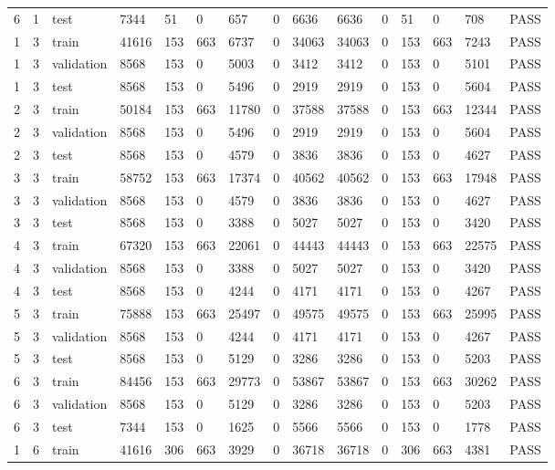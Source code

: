 \begin{longtable}{lllllllllllllll}
6 & 1 & test & 7344 & 51 & 0 & 657 & 0 & 6636 & 6636 & 0 & 51 & 0 & 708 & PASS \\
1 & 3 & train & 41616 & 153 & 663 & 6737 & 0 & 34063 & 34063 & 0 & 153 & 663 & 7243 & PASS \\
1 & 3 & validation & 8568 & 153 & 0 & 5003 & 0 & 3412 & 3412 & 0 & 153 & 0 & 5101 & PASS \\
1 & 3 & test & 8568 & 153 & 0 & 5496 & 0 & 2919 & 2919 & 0 & 153 & 0 & 5604 & PASS \\
2 & 3 & train & 50184 & 153 & 663 & 11780 & 0 & 37588 & 37588 & 0 & 153 & 663 & 12344 & PASS \\
2 & 3 & validation & 8568 & 153 & 0 & 5496 & 0 & 2919 & 2919 & 0 & 153 & 0 & 5604 & PASS \\
2 & 3 & test & 8568 & 153 & 0 & 4579 & 0 & 3836 & 3836 & 0 & 153 & 0 & 4627 & PASS \\
3 & 3 & train & 58752 & 153 & 663 & 17374 & 0 & 40562 & 40562 & 0 & 153 & 663 & 17948 & PASS \\
3 & 3 & validation & 8568 & 153 & 0 & 4579 & 0 & 3836 & 3836 & 0 & 153 & 0 & 4627 & PASS \\
3 & 3 & test & 8568 & 153 & 0 & 3388 & 0 & 5027 & 5027 & 0 & 153 & 0 & 3420 & PASS \\
4 & 3 & train & 67320 & 153 & 663 & 22061 & 0 & 44443 & 44443 & 0 & 153 & 663 & 22575 & PASS \\
4 & 3 & validation & 8568 & 153 & 0 & 3388 & 0 & 5027 & 5027 & 0 & 153 & 0 & 3420 & PASS \\
4 & 3 & test & 8568 & 153 & 0 & 4244 & 0 & 4171 & 4171 & 0 & 153 & 0 & 4267 & PASS \\
5 & 3 & train & 75888 & 153 & 663 & 25497 & 0 & 49575 & 49575 & 0 & 153 & 663 & 25995 & PASS \\
5 & 3 & validation & 8568 & 153 & 0 & 4244 & 0 & 4171 & 4171 & 0 & 153 & 0 & 4267 & PASS \\
5 & 3 & test & 8568 & 153 & 0 & 5129 & 0 & 3286 & 3286 & 0 & 153 & 0 & 5203 & PASS \\
6 & 3 & train & 84456 & 153 & 663 & 29773 & 0 & 53867 & 53867 & 0 & 153 & 663 & 30262 & PASS \\
6 & 3 & validation & 8568 & 153 & 0 & 5129 & 0 & 3286 & 3286 & 0 & 153 & 0 & 5203 & PASS \\
6 & 3 & test & 7344 & 153 & 0 & 1625 & 0 & 5566 & 5566 & 0 & 153 & 0 & 1778 & PASS \\
1 & 6 & train & 41616 & 306 & 663 & 3929 & 0 & 36718 & 36718 & 0 & 306 & 663 & 4381 & PASS \\

\end{longtable}
